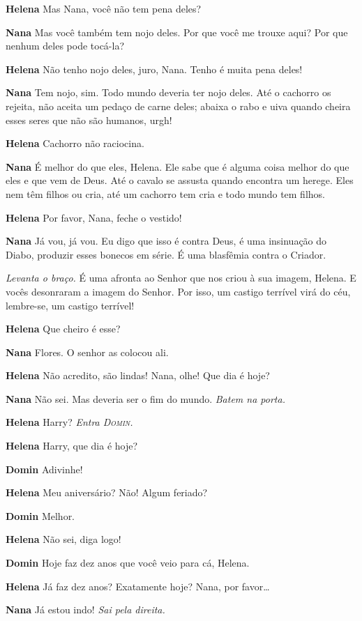 \textbf{Helena} Mas Nana, você não tem pena deles?

\textbf{Nana} Mas você também tem nojo deles. Por que você me trouxe aqui? Por que
nenhum deles pode tocá-la?

\textbf{Helena} Não tenho nojo deles, juro, Nana. Tenho é muita pena deles!

\textbf{Nana} Tem nojo, sim. Todo mundo deveria ter nojo deles. Até o cachorro os
rejeita, não aceita um pedaço de carne deles; abaixa o rabo e uiva quando
cheira esses seres que não são humanos, urgh!

\textbf{Helena} Cachorro não raciocina.

\textbf{Nana} É melhor do que eles, Helena. Ele sabe que é alguma coisa melhor do que
eles e que vem de Deus. Até o cavalo se assusta quando encontra um herege.
Eles nem têm filhos ou cria, até um cachorro tem cria e todo mundo tem filhos.

\textbf{Helena} Por favor, Nana, feche o vestido!

\textbf{Nana} Já vou, já vou. Eu digo que isso é contra Deus, é uma insinuação do Diabo,
produzir esses bonecos em série. É uma blasfêmia contra o Criador.

\emph{Levanta o braço.} É uma afronta ao Senhor que nos criou à sua imagem,
Helena. E vocês desonraram a imagem do Senhor. Por isso, um castigo terrível
virá do céu, lembre-se, um castigo terrível!

\textbf{Helena} Que cheiro é esse?

\textbf{Nana} Flores. O senhor as colocou ali.

\textbf{Helena} Não acredito, são lindas! Nana, olhe! Que dia é hoje?

\textbf{Nana} Não sei. Mas deveria ser o fim do mundo.
\emph{Batem na porta.}

\textbf{Helena} Harry?
\emph{Entra \textsc{Domin}.}

\textbf{Helena} Harry, que dia é hoje?

\textbf{Domin} Adivinhe!

\textbf{Helena} Meu aniversário? Não! Algum feriado?

\textbf{Domin} Melhor.

\textbf{Helena} Não sei, diga logo!

\textbf{Domin} Hoje faz dez anos que você veio para cá, Helena.

\textbf{Helena} Já faz dez anos? Exatamente hoje? Nana, por favor\ldots{}

\textbf{Nana} Já estou indo! \emph{Sai pela direita.}

